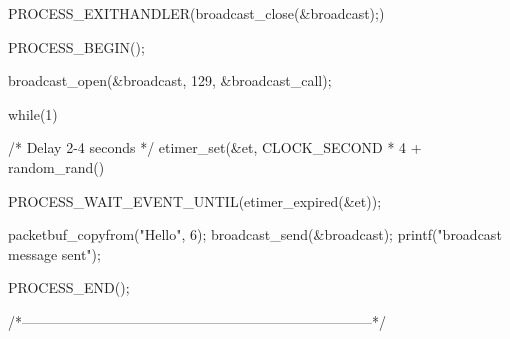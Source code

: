 \begin{DoxyCodeInclude}
{  PROCESS_EXITHANDLER(broadcast_close(&broadcast);)

  PROCESS_BEGIN();

  broadcast_open(&broadcast, 129, &broadcast_call);

  while(1) {

    /* Delay 2-4 seconds */
    etimer_set(&et, CLOCK_SECOND * 4 + random_rand() %

    PROCESS_WAIT_EVENT_UNTIL(etimer_expired(&et));

    packetbuf_copyfrom("Hello", 6);
    broadcast_send(&broadcast);
    printf("broadcast message sent\n");
  }

  PROCESS_END();
}
/*---------------------------------------------------------------------------*/
\end{DoxyCodeInclude}
 